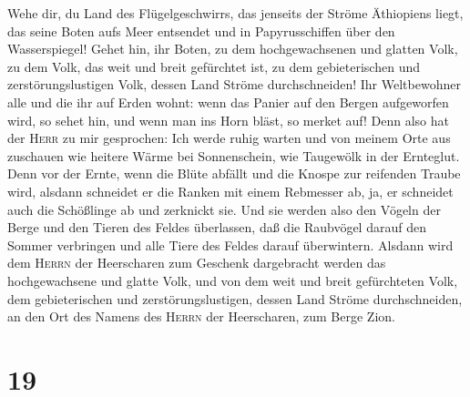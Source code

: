  Wehe dir, du Land des Flügelgeschwirrs, das jenseits der
Ströme Äthiopiens liegt, das seine Boten aufs Meer entsendet und in
Papyrusschiffen über den Wasserspiegel!  Gehet hin, ihr
Boten, zu dem hochgewachsenen und glatten Volk, zu dem Volk, das weit
und breit gefürchtet ist, zu dem gebieterischen und zerstörungslustigen
Volk, dessen Land Ströme durchschneiden!  Ihr Weltbewohner
alle und die ihr auf Erden wohnt: wenn das Panier auf den Bergen
aufgeworfen wird, so sehet hin, und wenn man ins Horn bläst, so merket
auf!  Denn also hat der \textsc{Herr} zu mir gesprochen:
Ich werde ruhig warten und von meinem Orte aus zuschauen wie heitere
Wärme bei Sonnenschein, wie Taugewölk in der Ernteglut. 
Denn vor der Ernte, wenn die Blüte abfällt und die Knospe zur reifenden
Traube wird, alsdann schneidet er die Ranken mit einem Rebmesser ab, ja,
er schneidet auch die Schößlinge ab und zerknickt sie. 
Und sie werden also den Vögeln der Berge und den Tieren des Feldes
überlassen, daß die Raubvögel darauf den Sommer verbringen und alle
Tiere des Feldes darauf überwintern.  Alsdann wird dem
\textsc{Herrn} der Heerscharen zum Geschenk dargebracht werden das
hochgewachsene und glatte Volk, und von dem weit und breit gefürchteten
Volk, dem gebieterischen und zerstörungslustigen, dessen Land Ströme
durchschneiden, an den Ort des Namens des \textsc{Herrn} der
Heerscharen, zum Berge Zion.

\hypertarget{section-18}{%
\section{19}\label{section-18}}

